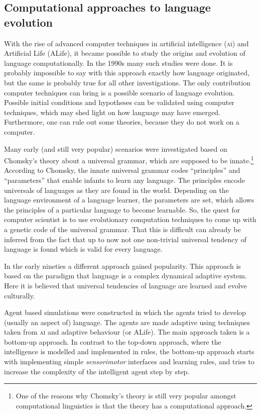 
\subsection{Computational approaches to language evolution}

With the rise of advanced computer techniques in artificial intelligence ({\scshape ai}) and Artificial Life (ALife), it became possible to study the origins and evolution of language computationally. In the 1990s many such studies were done. It is probably impossible to say with this approach exactly how language originated, but the same is probably true for all other investigations. The only contribution computer techniques can bring is a possible scenario of language evolution. Possible initial conditions and hypotheses can be validated using computer techniques, which may shed light on how language may have emerged. Furthermore, one can rule out some theories, because they do not work on a computer.


Many early (and still very popular) scenarios were investigated based on Chomsky's theory about a {\sc universal grammar}, which are supposed to be innate.\footnote{One of the reasons why Chomsky's theory is still very popular amongst computational linguistics is that the theory has a computational approach.} According to Chomsky, the innate universal grammar codes ``principles'' and ``parameters'' that enable infants to learn any language. The principles encode universals of languages as they are found in the world. Depending on the language environment of a language learner, the parameters are set, which allows the principles of a particular language to become learnable. So, the quest for computer scientist is to use evolutionary computation techniques to come up with a genetic code of the universal grammar. That this is difficult can already be inferred from the fact that up to now not one non-trivial universal tendency of language is found which is valid for every language.

In the early nineties a different approach gained popularity. This approach is based on the paradigm that language is a complex dynamical adaptive system. Here it is believed that universal tendencies of language are learned and evolve culturally.

Agent based simulations were constructed in which the agents tried to develop (usually an aspect of) language. The agents are made adaptive using techniques taken from {\scshape ai} and adaptive behaviour (or ALife). The main approach taken is a bottom-up approach. In contrast to the top-down approach, where the intelligence is modelled and implemented in rules, the bottom-up approach starts with implementing simple {\em sensorimotor} interfaces and learning rules, and tries to increase the complexity of the intelligent agent step by step.

